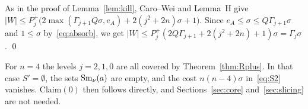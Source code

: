 As in the proof of Lemma~\ref{lem:kill}, Caro--Wei and Lemma~H give
$|W|\le P^+_j\bigl(2\max(\Gamma_{j+1}Q\sigma,e_A)+2(j^2+2n)\sigma+1\bigr)$. Since $e_A\le\sigma\le Q\Gamma_{j+1}\sigma$
and $1\le\sigma$ by~\eqref{eq:absorb}, we get $|W|\le P^+_j(2Q\Gamma_{j+1}+2(j^2+2n)+1)\sigma=\Gamma_j\sigma$. \qed

\begin{remark}
For $n=4$ the levels $j=2,1,0$ are all covered by Theorem~\ref{thm:Rplus}. In that case $S'=\emptyset$, the sets
$\mathrm{Sm}_\nu(a)$ are empty, and the cost $n(n-4)\sigma$ in~\eqref{eq:S2} vanishes. Claim$(0)$ then follows directly,
and Sections~\ref{sec:core} and~\ref{sec:slicing} are not needed.
\end{remark}
